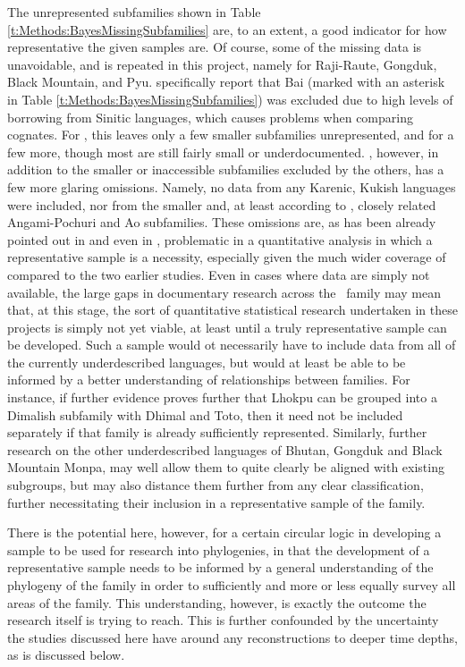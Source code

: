 The unrepresented subfamilies shown in Table \ref{t:Methods:BayesMissingSubfamilies} are, to an extent, a good indicator for how representative the given samples are. Of course, some of the missing data is unavoidable, and is repeated in this project, namely for Raji-Raute, Gongduk, Black Mountain, and Pyu.  specifically report that Bai (marked with an asterisk in Table \ref{t:Methods:BayesMissingSubfamilies}) was excluded due to high levels of borrowing from Sinitic languages, which causes problems when comparing cognates. For , this leaves only a few smaller subfamilies unrepresented, and for  a few more, though most are still fairly small or underdocumented. , however, in addition to the smaller or inaccessible subfamilies excluded by the others, has a few more glaring omissions. Namely, no data from any Karenic, Kukish languages were included, nor from the smaller and, at least according to , closely related Angami-Pochuri and Ao subfamilies. These omissions are, as has been already pointed out in  and even in , problematic in a quantitative analysis in which a representative sample is a necessity, especially given the much wider coverage of  compared to the two earlier studies. Even in cases where data are simply not available, the large gaps in documentary research across the \lfam\ family may mean that, at this stage, the sort of quantitative statistical research undertaken in these projects is simply not yet viable, at least until a truly representative sample can be developed. Such a sample would ot necessarily have to include data from all of the currently underdescribed languages, but would at least be able to be informed by a better understanding of relationships between families. For instance, if further evidence proves further that Lhokpu can be grouped into a Dimalish subfamily with Dhimal and Toto, then it need not be included separately if that family is already sufficiently represented. Similarly, further research on the other underdescribed languages of Bhutan, Gongduk and Black Mountain Monpa, may well allow them to quite clearly be aligned with existing subgroups, but may also distance them further from any clear classification, further necessitating their inclusion in a representative sample of the family.

There is the potential here, however, for a certain circular logic in developing a sample to be used for research into phylogenies, in that the development of a representative sample needs to be informed by a general understanding of the phylogeny of the family in order to sufficiently and more or less equally survey all areas of the family. This understanding, however, is exactly the outcome the research itself is trying to reach. This is further confounded by the uncertainty the studies discussed here have around any reconstructions to deeper time depths, as is discussed below.

